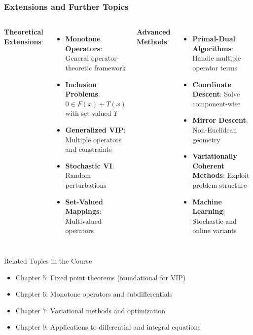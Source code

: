 \documentclass[aspectratio=169,10pt]{beamer}
\begin{document}
\begin{frame}
\frametitle{Extensions and Further Topics}

\vspace{0.3cm}

\begin{columns}[T]

\textbf{Theoretical Extensions}:
\begin{itemize}
    \item \textbf{Monotone Operators}: General operator-theoretic framework

    \item \textbf{Inclusion Problems}: $0 \in F(x) + T(x)$ with set-valued $T$

    \item \textbf{Generalized VIP}: Multiple operators and constraints

    \item \textbf{Stochastic VI}: Random perturbations

    \item \textbf{Set-Valued Mappings}: Multivalued operators
\end{itemize}


\textbf{Advanced Methods}:
\begin{itemize}
    \item \textbf{Primal-Dual Algorithms}: Handle multiple operator terms

    \item \textbf{Coordinate Descent}: Solve component-wise

    \item \textbf{Mirror Descent}: Non-Euclidean geometry

    \item \textbf{Variationally Coherent Methods}: Exploit problem structure

    \item \textbf{Machine Learning}: Stochastic and online variants
\end{itemize}

\end{columns}

\vspace{0.3cm}

\begin{block}{Related Topics in the Course}
\begin{itemize}
    \item Chapter 5: Fixed point theorems (foundational for VIP)
    \item Chapter 6: Monotone operators and subdifferentials
    \item Chapter 7: Variational methods and optimization
    \item Chapter 9: Applications to differential and integral equations
\end{itemize}
\end{block}

\end{frame}
\end{document}
